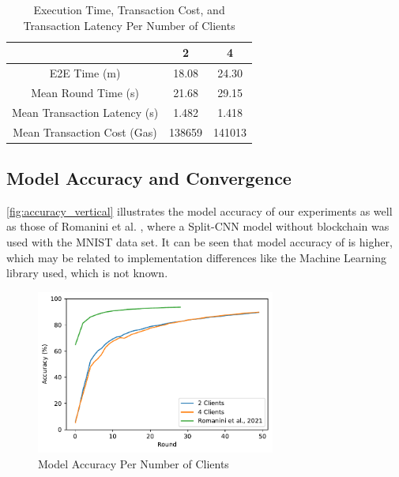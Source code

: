 \begin{table}[!ht]
\begin{tabular}{c|c|c} \hline \hline
                                & 2             & 4             \\ \hline \hline
E2E Time (m)                    & 18.08         &	24.30       \\ \hline
Mean Round Time (s)             & 21.68         &	29.15       \\ \hline
Mean Transaction Latency (s)    & 1.482         &	1.418       \\ \hline
Mean Transaction Cost (Gas)     & 138659        &	141013      \\ \hline
\end{tabular}
\caption{Execution Time, Transaction Cost, and Transaction Latency Per Number of Clients}
\label{tab:metrics_vertical}
\end{table}

\subsection{Model Accuracy and Convergence}

\autoref{fig:accuracy_vertical} illustrates the model accuracy of our experiments as well as those of Romanini et al. \cite{10.48550/arxiv.2104.00489}, where a Split-CNN model without blockchain was used with the MNIST data set. It can be seen that model accuracy of \cite{10.48550/arxiv.2104.00489} is higher, which may be related to implementation differences like the Machine Learning library used, which is not known.

\begin{figure}[!ht]
    \centering
    \centering
    \includegraphics[width=0.7\textwidth]{graphics/vertical/accuracy.pdf}
    \caption{Model Accuracy Per Number of Clients}
    \label{fig:accuracy_vertical}
\end{figure}

